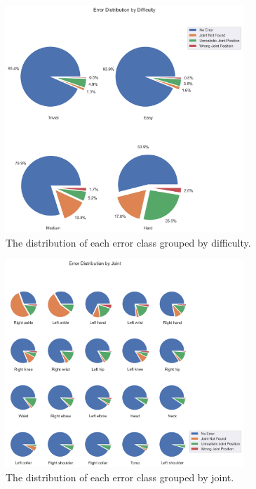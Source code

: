 \begin{figure}[ht]
  \centering
  \includegraphics[width=0.8\textwidth]{figures/Data/dist_joints/Error_Distribution_by_Difficulty.png}
  \caption[Error Distribution for each error class by difficulty]{The distribution of each error class grouped by difficulty.}
  \label{fig:jt_pie_diff}
\end{figure}

\begin{figure}[ht]
  \centering
  \includegraphics[width=0.8\textwidth]{figures/Data/dist_joints/Error_Distribution_by_Joint.png}
  \caption[Error Distribution for each error class by joint]{The distribution of each error class grouped by joint.}
  \label{fig:jt_pie_joint}
\end{figure}

